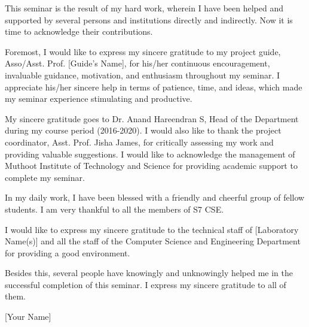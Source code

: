 
This seminar is the result of my hard work, wherein I have been helped and supported by several persons and institutions directly and indirectly. Now it is time to acknowledge their contributions.

Foremost, I would like to express my sincere gratitude to my project guide, Asso/Asst. Prof. [Guide's Name], for his/her continuous encouragement, invaluable guidance, motivation, and enthusiasm throughout my seminar. I appreciate his/her sincere help in terms of patience, time, and ideas, which made my seminar experience stimulating and productive.

My sincere gratitude goes to Dr. Anand Hareendran S, Head of the Department during my course period (2016-2020). I would also like to thank the project coordinator, Asst. Prof. Jisha James, for critically assessing my work and providing valuable suggestions. I would like to acknowledge the management of Muthoot Institute of Technology and Science for providing academic support to complete my seminar.

In my daily work, I have been blessed with a friendly and cheerful group of fellow students. I am very thankful to all the members of S7 CSE.

I would like to express my sincere gratitude to the technical staff of [Laboratory Name(s)] and all the staff of the Computer Science and Engineering Department for providing a good environment.

Besides this, several people have knowingly and unknowingly helped me in the successful completion of this seminar. I express my sincere gratitude to all of them.

\vfill %
\hfill %
[Your Name]
